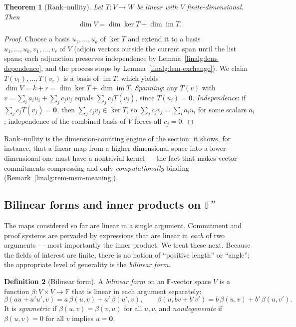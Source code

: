 \documentclass[11pt,a4paper]{article}
\newtheorem{theorem}{Theorem}[section]
\theoremstyle{definition}
\newtheorem{definition}[theorem]{Definition}
\theoremstyle{remark}
\newcommand{\F}{\ensuremath{\mathbb{F}}}
\DeclareMathOperator{\img}{im}
\begin{document}
\begin{theorem}[Rank--nullity]\label{linalg:thm-rank-nullity}
Let \(T \colon V \to W\) be linear with \(V\) finite-dimensional. Then
\[
\dim V = \dim \ker T + \dim \img T .
\]
\end{theorem}

\begin{proof}
Choose a basis \(u_1, \dots, u_k\) of \(\ker T\) and extend it to a basis \(u_1, \dots, u_k, v_1, \dots, v_r\) of \(V\) (adjoin vectors outside the current span until the list spans; each adjunction preserves independence by Lemma~\ref{linalg:lem-dependence}, and the process stops by Lemma~\ref{linalg:lem-exchange}). We claim \(T(v_1), \dots, T(v_r)\) is a basis of \(\img T\), which yields \(\dim V = k + r = \dim\ker T + \dim\img T\). \emph{Spanning}: any \(T(v)\) with \(v = \sum_i a_i u_i + \sum_j c_j v_j\) equals \(\sum_j c_j T(v_j)\), since \(T(u_i) = \mathbf 0\). \emph{Independence}: if \(\sum_j c_j T(v_j) = \mathbf 0\), then \(\sum_j c_j v_j \in \ker T\), so \(\sum_j c_j v_j = \sum_i a_i u_i\) for some scalars \(a_i\); independence of the combined basis of \(V\) forces all \(c_j = 0\).
\end{proof}

Rank--nullity is the dimension-counting engine of the section: it shows, for instance, that a linear map from a higher-dimensional space into a lower-dimensional one must have a nontrivial kernel --- the fact that makes vector commitments compressing and only \emph{computationally} binding (Remark~\ref{linalg:rem-msm-meaning}).

\subsection{Bilinear forms and inner products on \(\F^n\)}\label{linalg:subsec-bilinear}

The maps considered so far are linear in a single argument. Commitment and proof systems are pervaded by expressions that are linear in \emph{each} of two arguments — most importantly the inner product. We treat these next. Because the fields of interest are finite, there is no notion of ``positive length'' or ``angle''; the appropriate level of generality is the \emph{bilinear form}.

\begin{definition}[Bilinear form]\label{linalg:def-bilinear}
A \emph{bilinear form} on an \(\F\)-vector space \(V\) is a function \(\beta \colon V \times V \to \F\) that is linear in each argument separately:
\[
\beta(au + a'u', v) = a\,\beta(u,v) + a'\,\beta(u',v), \qquad
\beta(u, bv + b'v') = b\,\beta(u,v) + b'\,\beta(u,v').
\]
It is \emph{symmetric} if \(\beta(u,v) = \beta(v,u)\) for all \(u,v\), and \emph{nondegenerate} if \(\beta(u,v) = 0\) for all \(v\) implies \(u = \mathbf 0\).
\end{definition}
\end{document}
